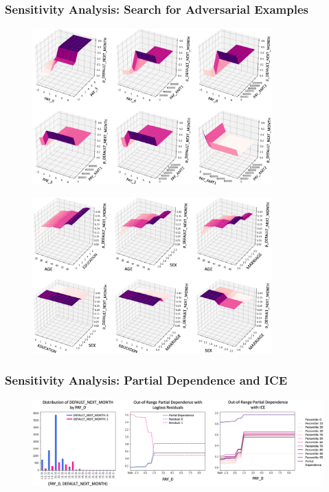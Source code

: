 \documentclass[11pt,
               aspectratio=43,
               hyperref={colorlinks}
               ]{beamer}
\begin{document}
			\begin{frame}[allowframebreaks]
		
				\frametitle{\textbf{Sensitivity Analysis}: Search for Adversarial Examples}
		
				\begin{figure}[htb]
					\begin{center}
						\includegraphics[height=170pt]{img/sa_max_prob.png}
					\end{center}
				\end{figure}	
				
				\framebreak
		
				\begin{figure}[htb]
					\begin{center}
						\includegraphics[height=170pt]{img/sa_max_prob_demo.png}
					\end{center}
				\end{figure}		
		
			\end{frame}
			
			\begin{frame}
		
				\frametitle{\textbf{Sensitivity Analysis}: Partial Dependence and ICE}
		
				\begin{figure}[htb]
					\begin{center}
						\includegraphics[height=96pt]{img/pd.png}
					\end{center}
				\end{figure}	
		
			\end{frame}			
			
\end{document}
